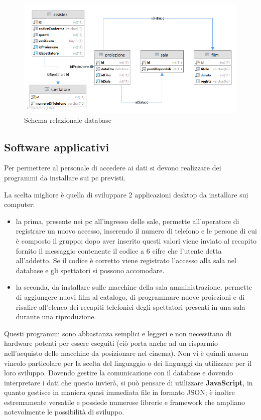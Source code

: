 \documentclass{article}
\begin{document}
    \begin{figure}[H]
    \centering
    \includegraphics[width=\textwidth]{SchemaDatabase.png}
    \caption{Schema relazionale database}
    \label{fig:SchemaTabelleDatabase}
    \end{figure}

\subsection{Software applicativi}\label{sec:Applicativo}
Per permettere al personale di accedere ai dati si devono realizzare dei programmi da installare sui pc previsti.

La scelta migliore è quella di sviluppare 2 applicazioni desktop da installare sui computer: 
\begin{itemize}
    \item la prima, presente nei pc all'ingresso delle sale, permette all'operatore di registrare un nuovo accesso, inserendo il numero di telefono e le persone di cui è composto il gruppo; dopo aver inserito questi valori viene inviato al recapito fornito il messaggio contenente il codice a 6 cifre che l'utente detta all'addetto. Se il codice è corretto viene registrato l'accesso alla sala nel database e gli spettatori si possono accomodare.
    \item la seconda, da installare sulle macchine della sala amministrazione, permette di aggiungere nuovi film al catalogo, di programmare nuove proiezioni e di risalire all'elenco dei recapiti telefonici degli spettatori presenti in una sala durante una riproduzione.
\end{itemize}

Questi programmi sono abbastanza semplici e leggeri e non necessitano di hardware potenti per essere eseguiti (ciò porta anche ad un risparmio nell'acquisto delle macchine da posizionare nel cinema). Non vi è quindi nessun vincolo particolare per la scelta del linguaggio o dei linguaggi da utilizzare per il loro sviluppo. Dovendo gestire la comunicazione con il database e dovendo interpretare i dati che questo invierà, si può pensare di utilizzare \textbf{JavaScript}, in quanto gestisce in maniera quasi immediata file in formato JSON; è inoltre estremamente versatile e possiede numerose librerie e framework che ampliano notevolmente le possibilità di sviluppo.
\end{document}
